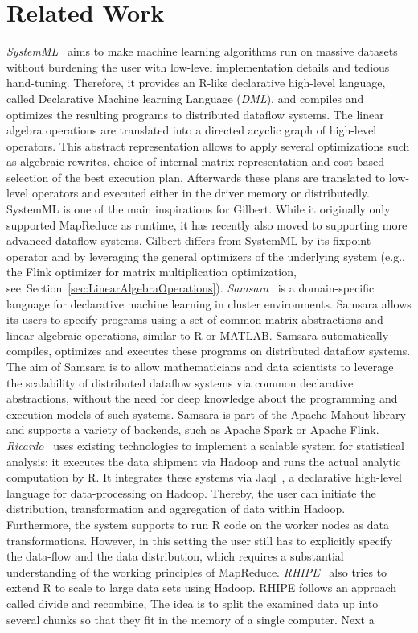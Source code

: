 \section{Related Work}
\label{sec:relatedWork}

{\em SystemML}~\cite{ghoting:2011a,Boehm2014,Boehm2014Hybrid,Schelter2015,Elgohary2016} aims to make machine learning algorithms run on massive datasets without burdening the user with low-level implementation details and tedious hand-tuning. Therefore, it provides an R-like declarative high-level language, called Declarative Machine learning Language (\emph{DML}), and compiles and optimizes the resulting programs to distributed dataflow systems.  The linear algebra operations are translated into a directed acyclic graph of high-level operators. This abstract representation allows to apply several optimizations such as algebraic rewrites, choice of internal matrix representation and cost-based selection of the best execution plan. Afterwards these plans are translated to low-level operators and executed either in the driver memory or distributedly. SystemML is one of the main inspirations for Gilbert. While it originally only supported MapReduce as runtime, it has recently also moved to supporting more advanced dataflow systems. Gilbert differs from SystemML by its fixpoint operator and by leveraging the general optimizers of the underlying system (e.g., the Flink optimizer for matrix multiplication optimization, see~Section~\ref{sec:LinearAlgebraOperations}). {\em Samsara}~\cite{Lyubimov2016} is a domain-specific language for declarative machine learning in cluster environments. Samsara allows its users to specify programs using a set of common matrix abstractions and linear algebraic operations, similar to R or MATLAB. Samsara automatically compiles, optimizes and executes these programs on distributed dataflow systems. The aim of Samsara is to allow mathematicians and data scientists to leverage the scalability of distributed dataflow systems via common declarative abstractions, without the need for deep knowledge about the programming and execution models of such systems. Samsara is part of the Apache Mahout library~\cite{mahout:2011a} and supports a variety of backends, such as Apache Spark or Apache Flink. {\em Ricardo}~\cite{das:2010a} uses existing technologies to implement a scalable system for statistical analysis: it executes the data shipment via Hadoop and runs the actual analytic computation by R. It integrates these systems via Jaql~\cite{beyer:2011a}, a declarative high-level language for data-processing on Hadoop. Thereby, the user can initiate the distribution, transformation and aggregation of data within Hadoop. Furthermore, the system supports to run R code on the worker nodes as data transformations. However, in this setting the user still has to explicitly specify the data-flow and the data distribution, which requires a substantial understanding of the working principles of MapReduce. {\em RHIPE}~\cite{guha:s2012a} also tries to extend R to scale to large data sets using Hadoop. RHIPE follows an approach called divide and recombine, The idea is to split the examined data up into several chunks so that they fit in the memory of a single computer. Next a 
